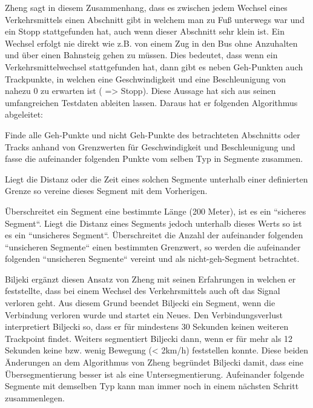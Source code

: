 Zheng sagt in diesem Zusammenhang, dass es zwischen jedem Wechsel eines Verkehrsmittels einen Abschnitt gibt in welchem man zu Fuß unterwegs war und ein Stopp stattgefunden hat, auch wenn dieser Abschnitt sehr klein ist. Ein Wechsel erfolgt nie direkt wie z.B. von einem Zug in den Bus ohne Anzuhalten und über einen Bahnsteig gehen zu müssen. Dies bedeutet, dass wenn ein Verkehrsmittelwechsel stattgefunden hat, dann gibt es neben Geh-Punkten auch Trackpunkte, in welchen eine Geschwindigkeit und eine Beschleunigung von nahezu 0 zu erwarten ist ( => Stopp).  Diese Aussage hat sich aus seinen umfangreichen Testdaten ableiten lassen. Daraus hat er folgenden Algorithmus abgeleitet:  \cite{zheng_understanding_2010}

\begin{pitemize}
\item Finde alle Geh-Punkte und nicht Geh-Punkte des betrachteten Abschnitts oder Tracks anhand von Grenzwerten für Geschwindigkeit und Beschleunigung und fasse die aufeinander folgenden Punkte vom selben Typ in Segmente zusammen.
\item Liegt die Distanz oder die Zeit eines solchen Segmente unterhalb einer definierten Grenze so vereine dieses Segment mit dem Vorherigen.
\item Überschreitet ein Segment eine bestimmte Länge (200 Meter), ist es ein ``sicheres Segment``. Liegt die Distanz eines Segments jedoch unterhalb dieses Werts so ist es ein ``unsicheres Segment``. Überschreitet die Anzahl der aufeinander folgenden ``unsicheren Segmente`` einen bestimmten Grenzwert, so werden die  aufeinander folgenden ``unsicheren Segmente`` vereint und als nicht-geh-Segment betrachtet.
\end{pitemize}

Biljeki ergänzt diesen Ansatz von Zheng mit seinen Erfahrungen in welchen er feststellte, dass bei einem Wechsel des Verkehrsmittels auch oft das Signal verloren geht. Aus diesem Grund beendet Biljecki ein Segment, wenn die Verbindung verloren wurde und startet ein Neues. Den Verbindungsverlust interpretiert Biljecki so, dass er für mindestens 30 Sekunden keinen weiteren Trackpoint findet. Weiters segmentiert Biljecki dann, wenn er für mehr als 12 Sekunden keine bzw. wenig Bewegung (< 2km/h) feststellen konnte. Diese beiden Änderungen an dem Algorithmus von Zheng begründet Biljecki damit, dass eine Übersegmentierung besser ist als eine Untersegmentierung. Aufeinander folgende Segmente mit demselben Typ kann man immer noch in einem nächsten Schritt zusammenlegen. \cite{biljecki_transportation_2013}

